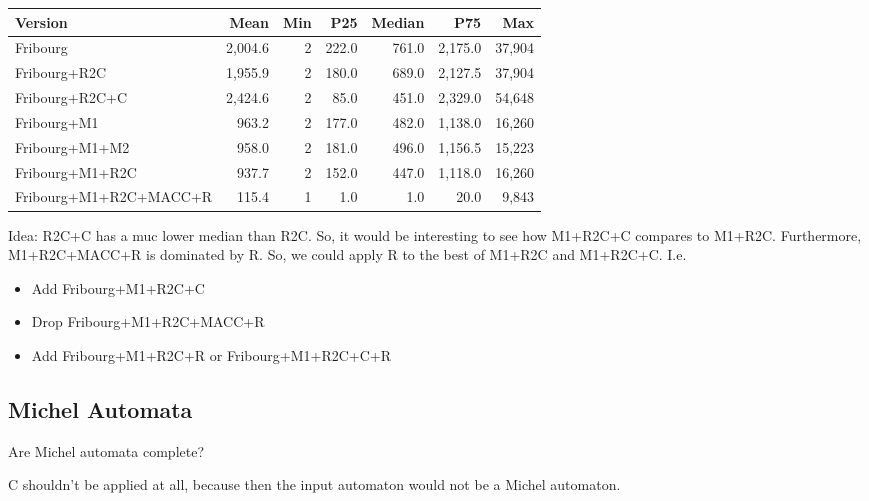 \begin{table}[ht]
\centering
\begin{tabular}{lrrrrrr}
  \toprule
Version & Mean & Min & P25 & Median & P75 & Max \\ 
  \midrule
Fribourg & 2,004.6 & 2 & 222.0 & 761.0 & 2,175.0 & 37,904 \\ 
  Fribourg+R2C & 1,955.9 & 2 & 180.0 & 689.0 & 2,127.5 & 37,904 \\ 
  Fribourg+R2C+C & 2,424.6 & 2 & 85.0 & 451.0 & 2,329.0 & 54,648 \\ 
  Fribourg+M1 & 963.2 & 2 & 177.0 & 482.0 & 1,138.0 & 16,260 \\ 
  Fribourg+M1+M2 & 958.0 & 2 & 181.0 & 496.0 & 1,156.5 & 15,223 \\ 
  Fribourg+M1+R2C & 937.7 & 2 & 152.0 & 447.0 & 1,118.0 & 16,260 \\ 
  Fribourg+M1+R2C+MACC+R & 115.4 & 1 & 1.0 & 1.0 & 20.0 & 9,843 \\ 
   \bottomrule
\end{tabular}
\end{table}

Idea: R2C+C has a muc lower median than R2C. So, it would be interesting to see how M1+R2C+C compares to M1+R2C. Furthermore, M1+R2C+MACC+R is dominated by R. So, we could apply R to the best of M1+R2C and M1+R2C+C. I.e.
\begin{itemize}
\item Add Fribourg+M1+R2C+C
\item Drop Fribourg+M1+R2C+MACC+R
\item Add Fribourg+M1+R2C+R or Fribourg+M1+R2C+C+R
\end{itemize}



\subsection{Michel Automata}
Are Michel automata complete?

C shouldn't be applied at all, because then the input automaton would not be a Michel automaton.



